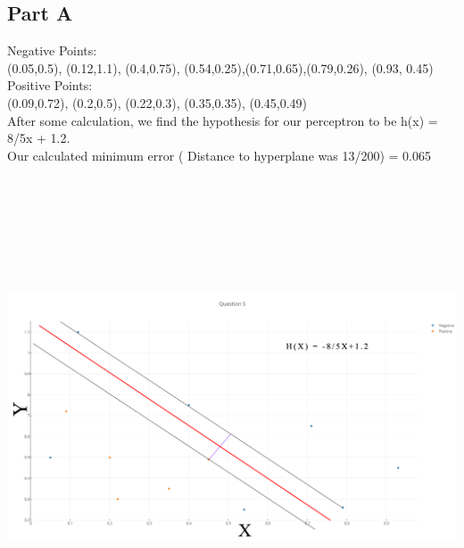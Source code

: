 \documentclass{article}
\begin{document}
\subsection{Part A}
{\large Negative Points:}
\\
(0.05,0.5), (0.12,1.1), (0.4,0.75), (0.54,0.25),(0.71,0.65),(0.79,0.26), (0.93, 0.45)
\\
{\large Positive Points:}
\\
(0.09,0.72), (0.2,0.5), (0.22,0.3), (0.35,0.35), (0.45,0.49)
\\
After some calculation, we find the hypothesis for our perceptron to be h(x) = 8/5x + 1.2.
\\
Our calculated minimum error ( Distance to hyperplane was 13/200) = 0.065
\\
\includegraphics[width=15cm,height=15cm,keepaspectratio]{"Question5"}
\\
\end{document}
